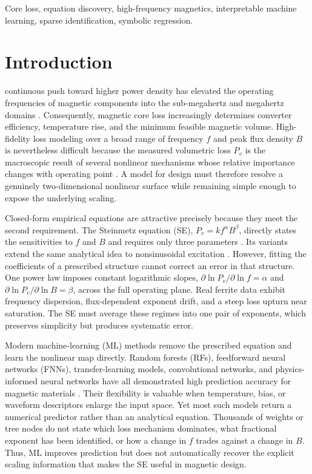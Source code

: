 \documentclass[lettersize,journal]{IEEEtran}
\begin{document}
\begin{IEEEkeywords}
Core loss, equation discovery, high-frequency magnetics, interpretable machine learning, sparse identification, symbolic regression.
\end{IEEEkeywords}

\section{Introduction}
 continuous push toward higher power density has elevated the operating frequencies of magnetic components into the sub-megahertz and megahertz domains \cite{7370781}. Consequently, magnetic core loss increasingly determines converter efficiency, temperature rise, and the minimum feasible magnetic volume. High-fidelity loss modeling over a broad range of frequency $f$ and peak flux density $B$ is nevertheless difficult because the measured volumetric loss $P_v$ is the macroscopic result of several nonlinear mechanisms whose relative importance changes with operating point \cite{1041954}. A model for design must therefore resolve a genuinely two-dimensional nonlinear surface while remaining simple enough to expose the underlying scaling.

Closed-form empirical equations are attractive precisely because they meet the second requirement. The Steinmetz equation (SE), $P_v=k f^{\alpha}B^{\beta}$, directly states the sensitivities to $f$ and $B$ and requires only three parameters \cite{1457110}. Its variants extend the same analytical idea to nonsinusoidal excitation \cite{5955126,10278470}. However, fitting the coefficients of a prescribed structure cannot correct an error in that structure. One power law imposes constant logarithmic slopes, $\partial\ln P_v/\partial\ln f=\alpha$ and $\partial\ln P_v/\partial\ln B=\beta$, across the full operating plane. Real ferrite data exhibit frequency dispersion, flux-dependent exponent drift, and a steep loss upturn near saturation. The SE must average these regimes into one pair of exponents, which preserves simplicity but produces systematic error.

Modern machine-learning (ML) methods remove the prescribed equation and learn the nonlinear map directly. Random forests (RFs), feedforward neural networks (FNNs), transfer-learning models, convolutional networks, and physics-informed neural networks have all demonstrated high prediction accuracy for magnetic materials \cite{10509368,10502151,10232863,10315145,10738458,11126536}. Their flexibility is valuable when temperature, bias, or waveform descriptors enlarge the input space. Yet most such models return a numerical predictor rather than an analytical equation. Thousands of weights or tree nodes do not state which loss mechanism dominates, what fractional exponent has been identified, or how a change in $f$ trades against a change in $B$. Thus, ML improves prediction but does not automatically recover the explicit scaling information that makes the SE useful in magnetic design.
\end{document}
